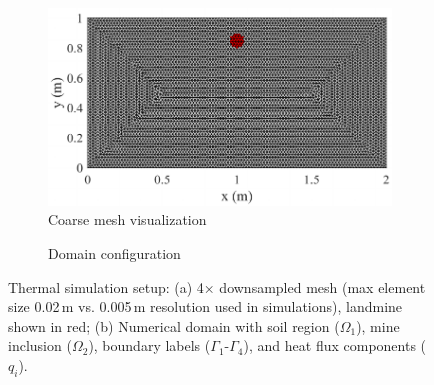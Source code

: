          \begin{figure}[htbp]
          \centering
          \begin{subfigure}[t]{0.48\textwidth} %
            \centering
            \includegraphics[width=\textwidth]{figs/Rory/thermal_mesh_new.pdf}
            \caption{Coarse mesh visualization}
            \label{fig:thermal_mesh}
          \end{subfigure}
          \hfill
          \begin{subfigure}[t]{0.48\textwidth}
            \centering
            \caption{Domain configuration}
            \label{fig:thermal_domain}
          \end{subfigure}
          \caption[Thermal simulations setup]{Thermal simulation setup: (a) 4× downsampled mesh (max element size 0.02\,m vs. 0.005\,m resolution used in simulations), landmine shown in red; (b) Numerical domain with soil region ($\Omega_1$), mine inclusion ($\Omega_2$), boundary labels ($\Gamma_1$\--$\Gamma_4$), and heat flux components ($q_i$).}
          \label{fig:thermal_setup}
        \end{figure}
    
